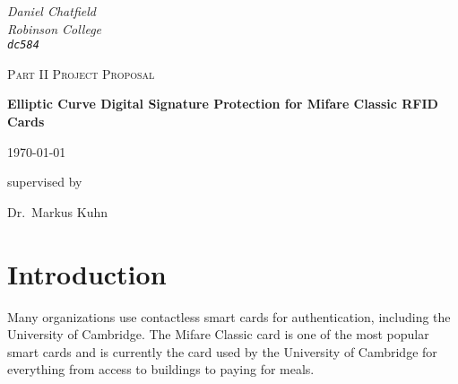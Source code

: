 \documentclass[a4paper, 12pt]{article}
\begin{document}
  \begin{titlepage}

    \begin{minipage}[t][][t]{0.5\textwidth}
    \end{minipage}
    \begin{minipage}{0.5\textwidth}
      \begin{flushright}
        \large
        \textit{Daniel Chatfield}
        \\
        \textit{Robinson College}
        \\
        \texttt{\textit{dc584}}
      \end{flushright}
    \end{minipage}

    \vfill

    \begin{center}

      {\scshape\Large Part II Project Proposal}
      \vspace{1.5cm}

      {\huge\bfseries Elliptic Curve Digital Signature Protection for Mifare
      Classic RFID Cards\par}
      \vspace{1cm}

      {\large \today}

      \vfill
  	  supervised by\par
  	  Dr.~Markus Kuhn

    \end{center}



  \end{titlepage}


  \section*{Introduction}

  Many organizations use contactless smart cards for authentication, including
  the University of Cambridge. The Mifare Classic card is one of the most
  popular smart cards and is currently the card used by the University of
  Cambridge for everything from access to buildings to paying for meals.
\end{document}
